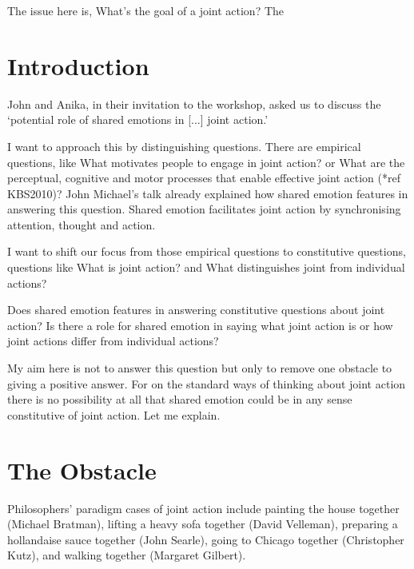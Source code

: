 \documentclass[12pt,a4paper]{extarticle}
\begin{document}
The issue here is, What's the goal of a joint action?  The 





\section{Introduction}
John and Anika, in their invitation to the workshop, asked us to discuss the `potential role of shared emotions in [...] joint action.'

I want to approach this by distinguishing questions.  There are empirical questions, like What motivates people to engage in joint action?  or What are the perceptual, cognitive and motor processes that enable effective joint action (*ref KBS2010)?  John Michael's talk already explained how shared emotion features in answering this question.  Shared emotion facilitates joint action by synchronising attention, thought and action.  


I want to shift our focus from those empirical questions to constitutive questions, questions like What is joint action? and  What distinguishes joint from individual actions?


Does shared emotion features in answering constitutive questions about joint action?  Is there a role for shared emotion in saying what joint action is or how joint actions differ from individual actions?  

My aim here is not to answer this question but only to remove one obstacle to giving a positive answer.  For on the standard ways of thinking about joint action there is no possibility at all that shared emotion could be in any sense constitutive of joint action.  Let me explain.


\section{The Obstacle}

Philosophers' paradigm cases of joint action include painting the house together (Michael Bratman), lifting a heavy sofa together (David Velleman), preparing a hollandaise sauce together (John Searle), going to Chicago together (Christopher Kutz), and walking together (Margaret Gilbert).  
\end{document}
